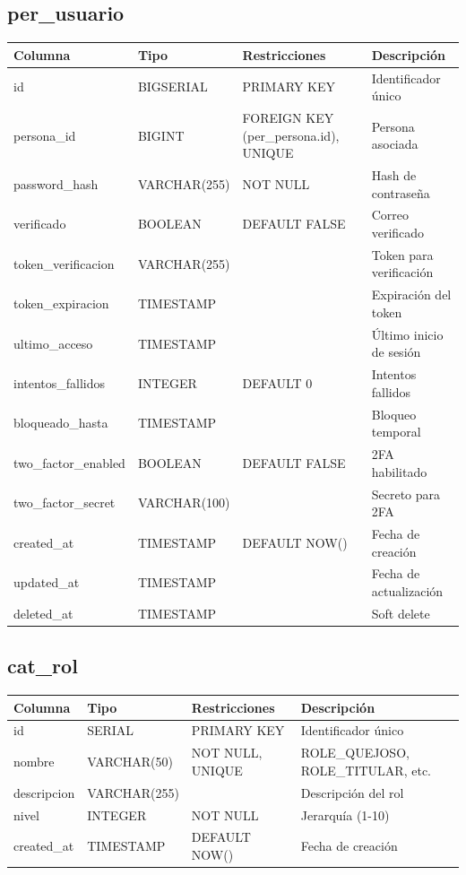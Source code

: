 \documentclass[12pt, a4paper]{article}
\begin{document}
\subsection{per\_usuario}
\begin{longtable}{|p{3.5cm}|p{2.5cm}|p{3cm}|p{5cm}|}
    \hline
    \rowcolor[gray]{0.9}
    \textbf{Columna} & \textbf{Tipo} & \textbf{Restricciones} & \textbf{Descripción} \\
    \hline
    id & BIGSERIAL & PRIMARY KEY & Identificador único \\
    \hline
    persona\_id & BIGINT & FOREIGN KEY (per\_persona.id), UNIQUE & Persona asociada \\
    \hline
    password\_hash & VARCHAR(255) & NOT NULL & Hash de contraseña \\
    \hline
    verificado & BOOLEAN & DEFAULT FALSE & Correo verificado \\
    \hline
    token\_verificacion & VARCHAR(255) & & Token para verificación \\
    \hline
    token\_expiracion & TIMESTAMP & & Expiración del token \\
    \hline
    ultimo\_acceso & TIMESTAMP & & Último inicio de sesión \\
    \hline
    intentos\_fallidos & INTEGER & DEFAULT 0 & Intentos fallidos \\
    \hline
    bloqueado\_hasta & TIMESTAMP & & Bloqueo temporal \\
    \hline
    two\_factor\_enabled & BOOLEAN & DEFAULT FALSE & 2FA habilitado \\
    \hline
    two\_factor\_secret & VARCHAR(100) & & Secreto para 2FA \\
    \hline
    created\_at & TIMESTAMP & DEFAULT NOW() & Fecha de creación \\
    \hline
    updated\_at & TIMESTAMP & & Fecha de actualización \\
    \hline
    deleted\_at & TIMESTAMP & & Soft delete \\
    \hline
\end{longtable}

\subsection{cat\_rol}
\begin{longtable}{|p{3.5cm}|p{2.5cm}|p{3cm}|p{5cm}|}
    \hline
    \rowcolor[gray]{0.9}
    \textbf{Columna} & \textbf{Tipo} & \textbf{Restricciones} & \textbf{Descripción} \\
    \hline
    id & SERIAL & PRIMARY KEY & Identificador único \\
    \hline
    nombre & VARCHAR(50) & NOT NULL, UNIQUE & ROLE\_QUEJOSO, ROLE\_TITULAR, etc. \\
    \hline
    descripcion & VARCHAR(255) & & Descripción del rol \\
    \hline
    nivel & INTEGER & NOT NULL & Jerarquía (1-10) \\
    \hline
    created\_at & TIMESTAMP & DEFAULT NOW() & Fecha de creación \\
    \hline
\end{longtable}
\end{document}
